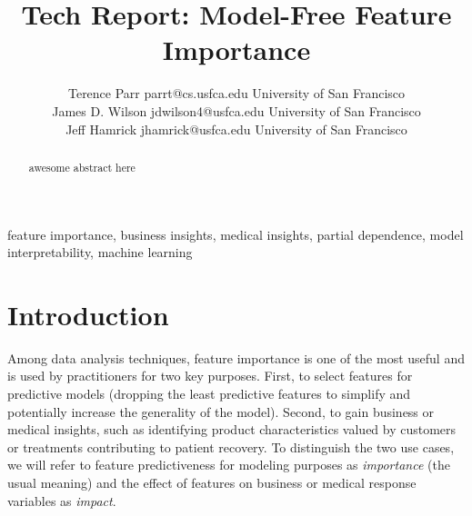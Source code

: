 \documentclass[11pt]{article}
\begin{document}
\def\spacingset#1{\renewcommand{\baselinestretch}%
{#1}\small\normalsize} \spacingset{1}



\title{\bf Tech Report: Model-Free Feature Importance}

\author{Terence Parr \email parrt@cs.usfca.edu
\addr University of San Francisco\\
\AND James D. Wilson \email jdwilson4@usfca.edu
\addr University of San Francisco\\
\AND Jeff Hamrick \email jhamrick@usfca.edu
      \addr University of San Francisco}

\maketitle

\begin{abstract}%
awesome abstract here
\end{abstract}

\begin{keywords}
feature importance, business insights, medical insights, partial dependence, model interpretability, machine learning
\end{keywords}

\section{Introduction}
\label{sec:intro}

Among data analysis techniques, feature importance is one of the most useful and is used by practitioners for two key purposes. First, to select features for predictive models (dropping the least predictive features to simplify and potentially increase the generality of the model). Second, to gain business or medical insights, such as identifying product characteristics valued by customers or treatments contributing to patient recovery.  To distinguish the two use cases, we will refer to feature predictiveness for modeling purposes as {\em importance} (the usual meaning) and the effect of features on business or medical response variables as {\em impact}.
\end{document}
